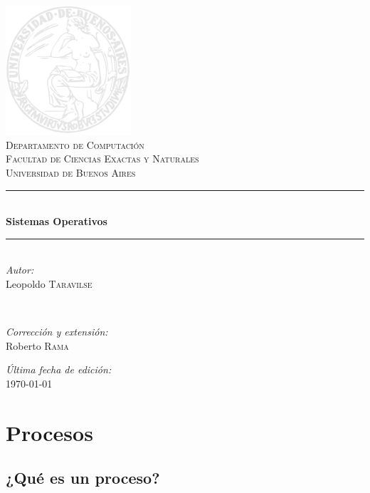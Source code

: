 \documentclass{article}
\newcommand{\HRule}{\rule{\linewidth}{0.5mm}}
\begin{document}
\begin{titlepage}
\begin{center}

\includegraphics[width=0.35\textwidth]{logo_uba}\\[1cm]

\textsc{\LARGE Departamento de Computaci\'on}\\[1.5cm]

\textsc{\Large Facultad de Ciencias Exactas y Naturales}\\[0.5cm]
\textsc{\Large Universidad de Buenos Aires}\\[0.5cm]

\HRule \\[0.4cm]
{ \huge \bfseries Sistemas Operativos \\[0.4cm] }

\HRule \\[1.5cm]

\emph{Autor:}\\
Leopoldo \textsc{Taravilse}

~

\emph{Corrección y extensión:}\\
Roberto \textsc{Rama}

\vfill

\emph{Última fecha de edición:}\\
{\large \today}

\end{center}
\end{titlepage}
\tableofcontents
\newpage
\section{Procesos}

\subsection{¿Qu\'e es un proceso?}
\end{document}
